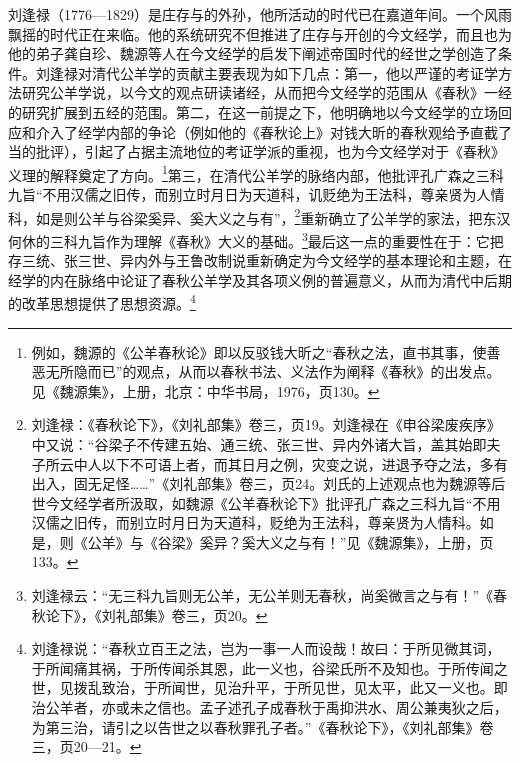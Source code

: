 \documentclass[a4paper, 12pt, openright]{ctexbook}
\begin{document}
刘逢禄（1776—1829）是庄存与的外孙，他所活动的时代已在嘉道年间。一个风雨飘摇的时代正在来临。他的系统研究不但推进了庄存与开创的今文经学，而且也为他的弟子龚自珍、魏源等人在今文经学的启发下阐述帝国时代的经世之学创造了条件。刘逢禄对清代公羊学的贡献主要表现为如下几点：第一，他以严谨的考证学方法研究公羊学说，以今文的观点研读诸经，从而把今文经学的范围从《春秋》一经的研究扩展到五经的范围。第二，在这一前提之下，他明确地以今文经学的立场回应和介入了经学内部的争论（例如他的《春秋论上》对钱大昕的春秋观给予直截了当的批评），引起了占据主流地位的考证学派的重视，也为今文经学对于《春秋》义理的解释奠定了方向。\footnote{例如，魏源的《公羊春秋论》即以反驳钱大昕之“春秋之法，直书其事，使善恶无所隐而已”的观点，从而以春秋书法、义法作为阐释《春秋》的出发点。见《魏源集》，上册，北京：中华书局，1976，页130。}第三，在清代公羊学的脉络内部，他批评孔广森之三科九旨“不用汉儒之旧传，而别立时月日为天道科，讥贬绝为王法科，尊亲贤为人情科，如是则公羊与谷梁奚异、奚大义之与有”，\footnote{刘逢禄：《春秋论下》，《刘礼部集》卷三，页19。刘逢禄在《申谷梁废疾序》中又说：“谷梁子不传建五始、通三统、张三世、异内外诸大旨，盖其始即夫子所云中人以下不可语上者，而其日月之例，灾变之说，进退予夺之法，多有出入，固无足怪……”《刘礼部集》卷三，页24。刘氏的上述观点也为魏源等后世今文经学者所汲取，如魏源《公羊春秋论下》批评孔广森之三科九旨“不用汉儒之旧传，而别立时月日为天道科，贬绝为王法科，尊亲贤为人情科。如是，则《公羊》与《谷梁》奚异？奚大义之与有！”见《魏源集》，上册，页133。}重新确立了公羊学的家法，把东汉何休的三科九旨作为理解《春秋》大义的基础。\footnote{刘逢禄云：“无三科九旨则无公羊，无公羊则无春秋，尚奚微言之与有！”《春秋论下》，《刘礼部集》卷三，页20。}最后这一点的重要性在于：它把存三统、张三世、异内外与王鲁改制说重新确定为今文经学的基本理论和主题，在经学的内在脉络中论证了春秋公羊学及其各项义例的普遍意义，从而为清代中后期的改革思想提供了思想资源。\footnote{刘逢禄说：“春秋立百王之法，岂为一事一人而设哉！故曰：于所见微其词，于所闻痛其祸，于所传闻杀其恩，此一义也，谷梁氏所不及知也。于所传闻之世，见拨乱致治，于所闻世，见治升平，于所见世，见太平，此又一义也。即治公羊者，亦或未之信也。孟子述孔子成春秋于禹抑洪水、周公兼夷狄之后，为第三治，请引之以告世之以春秋罪孔子者。”《春秋论下》，《刘礼部集》卷三，页20—21。}
\end{document}
